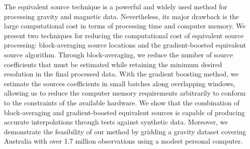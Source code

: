 The equivalent source technique is a powerful and widely used method for
processing gravity and magnetic data.  Nevertheless, its major
drawback is the large computational cost in terms of processing time and
computer memory.
We present two techniques for reducing the computational cost of equivalent
source processing: block-averaging source locations and the
gradient-boosted equivalent source algorithm.
Through block-averaging, we reduce the number of source coefficients that
must be estimated while retaining the minimum desired resolution in the final
processed data.
With the gradient boosting method, we estimate the sources coefficients in
small batches along overlapping windows, allowing us to reduce the computer
memory requirements arbitrarily to conform to the constraints of the
available hardware.
We show that the combination of block-averaging and gradient-boosted
equivalent sources is capable of producing accurate interpolations through
tests against synthetic data.
Moreover, we demonstrate the feasibility of our method by gridding a gravity
dataset covering Australia with over 1.7 million observations using a modest
personal computer.
